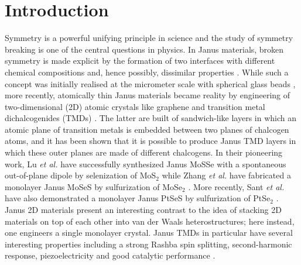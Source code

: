 \documentclass[reprint, superscriptaddress, amsmath,amssymb,prb,twocolumn]{revtex4-2}
\begin{document}
\maketitle

\newpage

\section{Introduction}


Symmetry is a powerful unifying principle in science and the study of symmetry breaking is one of the central questions in physics. In Janus materials, broken symmetry is made explicit by the formation of two interfaces with different chemical compositions and, hence possibly, dissimilar properties \cite{walther_chemrev_2013}. While such a concept was initially realised at the micrometer scale with spherical glass beads \cite{casagrande_epl_1989}, more recently, atomically thin Janus materials became reality by engineering of two-dimensional (2D) atomic crystals like graphene and transition metal dichalcogenides (TMDs) \cite{lu_natnano_2017, zhang_acsnano_2017, li_small_2018, Sant_2020, yagmurcukardes_apr_2020, zhang_jmca_2020}. The latter are built of sandwich-like layers in which an atomic plane of transition metals is embedded between two planes of chalcogen atoms, and it has been shown that it is possible to produce Janus TMD layers in which these outer planes are made of different chalcogens. In their pioneering work, Lu {\it{et al.}} have successfully synthesized Janus MoSSe with a spontaneous out-of-plane dipole by selenization of MoS$_{2}$ \cite{lu_natnano_2017} while Zhang {\it{et al.}} have fabricated a monolayer Janus MoSeS by sulfurization of MoSe$_2$ \cite{zhang_acsnano_2017}. More recently, Sant {\it{et al.}} have also demonstrated a monolayer Janus PtSeS by sulfurization of PtSe$_2$ \cite{Sant_2020}. Janus 2D materials present an interesting contrast to the idea of stacking 2D materials on top of each other into van der Waals heterostructures; \cite{geim_nature_2013} here instead, one engineers a single monolayer crystal. Janus TMDs in particular have several interesting properties including a strong Rashba spin splitting, second-harmonic response, piezoelectricity and good catalytic performance \cite{li_small_2018, yagmurcukardes_apr_2020, zhang_jmca_2020, yuan_pccp_2017}.
\end{document}
